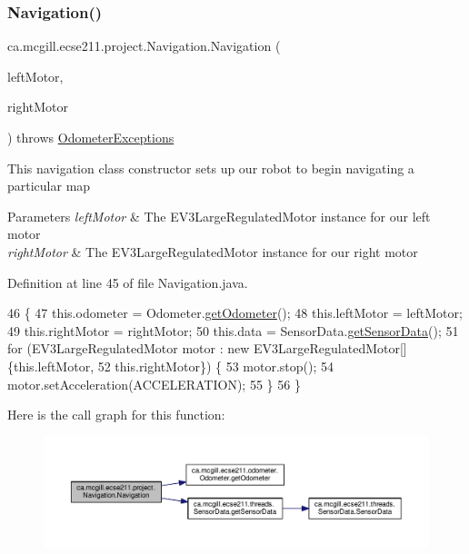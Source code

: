 \subsubsection{\texorpdfstring{Navigation()}{Navigation()}}
{\footnotesize\ttfamily ca.\+mcgill.\+ecse211.\+project.\+Navigation.\+Navigation (\begin{DoxyParamCaption}\item[{E\+V3\+Large\+Regulated\+Motor}]{left\+Motor,  }\item[{E\+V3\+Large\+Regulated\+Motor}]{right\+Motor }\end{DoxyParamCaption}) throws \hyperlink{classca_1_1mcgill_1_1ecse211_1_1odometer_1_1_odometer_exceptions}{Odometer\+Exceptions}}

This navigation class constructor sets up our robot to begin navigating a particular map


\begin{DoxyParams}{Parameters}
{\em left\+Motor} & The E\+V3\+Large\+Regulated\+Motor instance for our left motor \\
\hline
{\em right\+Motor} & The E\+V3\+Large\+Regulated\+Motor instance for our right motor \\
\hline
\end{DoxyParams}


Definition at line 45 of file Navigation.\+java.


\begin{DoxyCode}
46                                 \{
47     this.odometer = Odometer.\hyperlink{classca_1_1mcgill_1_1ecse211_1_1odometer_1_1_odometer_a99171f11e34dea918fa9dd069d721439}{getOdometer}();
48     this.leftMotor = leftMotor;
49     this.rightMotor = rightMotor;
50     this.data = SensorData.\hyperlink{classca_1_1mcgill_1_1ecse211_1_1threads_1_1_sensor_data_a8260aba53b4474ca1275e4ce26157977}{getSensorData}();
51     \textcolor{keywordflow}{for} (EV3LargeRegulatedMotor motor : \textcolor{keyword}{new} EV3LargeRegulatedMotor[] \{this.leftMotor,
52         this.rightMotor\}) \{
53       motor.stop();
54       motor.setAcceleration(ACCELERATION);
55     \}
56   \}
\end{DoxyCode}
Here is the call graph for this function\+:\nopagebreak
\begin{figure}[H]
\begin{center}
\leavevmode
\includegraphics[width=350pt]{classca_1_1mcgill_1_1ecse211_1_1project_1_1_navigation_aaee14b67c392ddd951e3ce21224c3e56_cgraph}
\end{center}
\end{figure}


